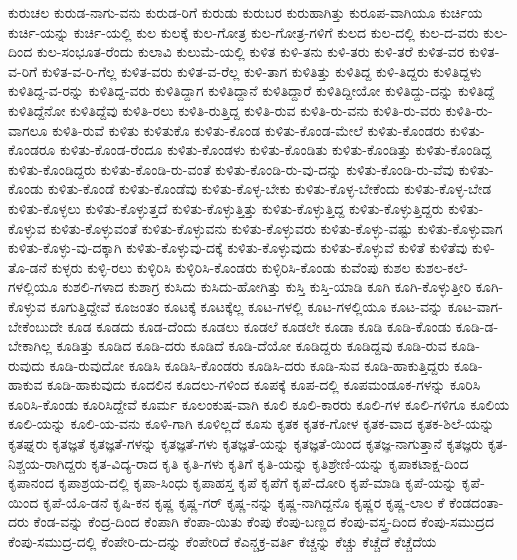 {ಕುರುಚಲ
ಕುರುಡ-ನಾಗು-ವನು
ಕುರುಡ-ರಿಗೆ
ಕುರುಡು
ಕುರುಬರ
ಕುರುಹಾಗಿತ್ತು
ಕುರೂಪ-ವಾಗಿಯೂ
ಕುರ್ಚಿಯ
ಕುರ್ಚಿ-ಯನ್ನು
ಕುರ್ಚಿ-ಯಲ್ಲಿ
ಕುಲ
ಕುಲಕ್ಕೆ
ಕುಲ-ಗೋತ್ರ
ಕುಲ-ಗೋತ್ರ-ಗಳಿಗೆ
ಕುಲದ
ಕುಲ-ದಲ್ಲಿ
ಕುಲ-ದ-ವರು
ಕುಲ-ದಿಂದ
ಕುಲ-ಸಂಭೂತ-ರೆಂದು
ಕುಲಾವಿ
ಕುಲುಮೆ-ಯಲ್ಲಿ
ಕುಳಿತ
ಕುಳಿ-ತನು
ಕುಳಿ-ತರು
ಕುಳಿ-ತರೆ
ಕುಳಿತ-ವರ
ಕುಳಿತ-ವ-ರಿಗೆ
ಕುಳಿತ-ವ-ರಿ-ಗೆಲ್ಲ
ಕುಳಿತ-ವರು
ಕುಳಿತ-ವ-ರೆಲ್ಲ
ಕುಳಿ-ತಾಗ
ಕುಳಿತಿತ್ತು
ಕುಳಿತಿದ್ದ
ಕುಳಿ-ತಿದ್ದರು
ಕುಳಿತಿದ್ದಳು
ಕುಳಿತಿದ್ದ-ವ-ರನ್ನು
ಕುಳಿತಿದ್ದ-ವರು
ಕುಳಿತಿದ್ದಾಗ
ಕುಳಿತಿದ್ದಾನೆ
ಕುಳಿತಿದ್ದಾರೆ
ಕುಳಿತಿದ್ದೀಯೋ
ಕುಳಿತಿದ್ದು-ದನ್ನು
ಕುಳಿತಿದ್ದೆ
ಕುಳಿತಿದ್ದೆನೋ
ಕುಳಿತಿದ್ದೆವು
ಕುಳಿತಿ-ರಲು
ಕುಳಿತಿ-ರುತ್ತಿದ್ದ
ಕುಳಿತಿ-ರುವ
ಕುಳಿತಿ-ರು-ವನು
ಕುಳಿತಿ-ರು-ವರು
ಕುಳಿತಿ-ರು-ವಾಗಲೂ
ಕುಳಿತಿ-ರುವೆ
ಕುಳಿತು
ಕುಳಿತುಕೊ
ಕುಳಿತು-ಕೊಂಡ
ಕುಳಿತು-ಕೊಂಡ-ಮೇಲೆ
ಕುಳಿತು-ಕೊಂಡರು
ಕುಳಿತು-ಕೊಂಡರೂ
ಕುಳಿತು-ಕೊಂಡ-ರೆಂದೂ
ಕುಳಿತು-ಕೊಂಡಳು
ಕುಳಿತು-ಕೊಂಡಿತು
ಕುಳಿತು-ಕೊಂಡಿತ್ತು
ಕುಳಿತು-ಕೊಂಡಿದ್ದ
ಕುಳಿತು-ಕೊಂಡಿದ್ದರು
ಕುಳಿತು-ಕೊಂಡಿ-ರು-ವಂತೆ
ಕುಳಿತು-ಕೊಂಡಿ-ರು-ವು-ದನ್ನು
ಕುಳಿತು-ಕೊಂಡಿ-ರು-ವೆವು
ಕುಳಿತು-ಕೊಂಡು
ಕುಳಿತು-ಕೊಂಡೆ
ಕುಳಿತು-ಕೊಂಡೆವು
ಕುಳಿತು-ಕೊಳ್ಳ-ಬೇಕು
ಕುಳಿತು-ಕೊಳ್ಳ-ಬೇಕೆಂದು
ಕುಳಿತು-ಕೊಳ್ಳ-ಬೇಡ
ಕುಳಿತು-ಕೊಳ್ಳಲು
ಕುಳಿತು-ಕೊಳ್ಳುತ್ತದೆ
ಕುಳಿತು-ಕೊಳ್ಳುತ್ತಿತ್ತು
ಕುಳಿತು-ಕೊಳ್ಳುತ್ತಿದ್ದ
ಕುಳಿತು-ಕೊಳ್ಳುತ್ತಿದ್ದರು
ಕುಳಿತು-ಕೊಳ್ಳುವ
ಕುಳಿತು-ಕೊಳ್ಳುವಂತೆ
ಕುಳಿತು-ಕೊಳ್ಳುವನು
ಕುಳಿತು-ಕೊಳ್ಳುವರು
ಕುಳಿತು-ಕೊಳ್ಳು-ವಷ್ಟು
ಕುಳಿತು-ಕೊಳ್ಳುವಾಗ
ಕುಳಿತು-ಕೊಳ್ಳು-ವು-ದಕ್ಕಾಗಿ
ಕುಳಿತು-ಕೊಳ್ಳುವು-ದಕ್ಕೆ
ಕುಳಿತು-ಕೊಳ್ಳುವುದು
ಕುಳಿತು-ಕೊಳ್ಳುವೆ
ಕುಳಿತೆ
ಕುಳಿತೆವು
ಕುಳಿ-ತೊ-ಡನೆ
ಕುಳ್ಳರು
ಕುಳ್ಳಿ-ರಲು
ಕುಳ್ಳಿರಿಸಿ
ಕುಳ್ಳಿರಿಸಿ-ಕೊಂಡರು
ಕುಳ್ಳಿರಿಸಿ-ಕೊಂಡು
ಕುವೆಂಪು
ಕುಶಲ
ಕುಶಲ-ಕಲೆ-ಗಳಲ್ಲಿಯೂ
ಕುಶಲಿ-ಗಳಾದ
ಕುಶಾಗ್ರ
ಕುಸಿದು
ಕುಸಿದು-ಹೋಗಿತ್ತು
ಕುಸ್ತಿ
ಕುಸ್ತಿ-ಯಾಡಿ
ಕೂಗಿ
ಕೂಗಿ-ಕೊಳ್ಳುತ್ತೀರಿ
ಕೂಗಿ-ಕೊಳ್ಳುವ
ಕೂಗುತ್ತಿದ್ದೇವೆ
ಕೂಜಂತಂ
ಕೂಟಕ್ಕೆ
ಕೂಟಕ್ಕೆಲ್ಲ
ಕೂಟ-ಗಳಲ್ಲಿ
ಕೂಟ-ಗಳಲ್ಲಿಯೂ
ಕೂಟ-ವನ್ನು
ಕೂಟ-ವಾಗ-ಬೇಕೆಂಬುದೇ
ಕೂಡ
ಕೂಡದು
ಕೂಡ-ದೆಂದು
ಕೂಡಲು
ಕೂಡಲೆ
ಕೂಡಲೇ
ಕೂಡಾ
ಕೂಡಿ
ಕೂಡಿ-ಕೊಂಡು
ಕೂಡಿ-ಡ-ಬೇಕಾಗಿಲ್ಲ
ಕೂಡಿತ್ತು
ಕೂಡಿದ
ಕೂಡಿ-ದರು
ಕೂಡಿದೆ
ಕೂಡಿ-ದೆಯೋ
ಕೂಡಿದ್ದರು
ಕೂಡಿದ್ದವು
ಕೂಡಿ-ರುವ
ಕೂಡಿ-ರುವುದು
ಕೂಡಿ-ರುವುದೋ
ಕೂಡಿಸಿ
ಕೂಡಿಸಿ-ಕೊಂಡರು
ಕೂಡಿಸಿ-ದರು
ಕೂಡಿ-ಸುವ
ಕೂಡಿ-ಹಾಕುತ್ತಿದ್ದರು
ಕೂಡಿ-ಹಾಕುವ
ಕೂಡಿ-ಹಾಕುವುದು
ಕೂದಲಿನ
ಕೂದಲು-ಗಳಿಂದ
ಕೂಪಕ್ಕೆ
ಕೂಪ-ದಲ್ಲಿ
ಕೂಪಮಂಡೂಕ-ಗಳನ್ನು
ಕೂರಿಸಿ
ಕೂರಿಸಿ-ಕೊಂಡು
ಕೂರಿಸಿದ್ದೇವೆ
ಕೂರ್ಮ
ಕೂಲಂಕುಷ-ವಾಗಿ
ಕೂಲಿ
ಕೂಲಿ-ಕಾರರು
ಕೂಲಿ-ಗಳ
ಕೂಲಿ-ಗಳಿಗೂ
ಕೂಲಿಯ
ಕೂಲಿ-ಯನ್ನು
ಕೂಲಿ-ಯ-ವನು
ಕೂಳಿ-ಗಾಗಿ
ಕೂಳಿಲ್ಲದೆ
ಕೂಸು
ಕೃತಕ
ಕೃತಕ-ಗೋಳ
ಕೃತಕ-ವಾದ
ಕೃತಕ-ಶಿಲೆ-ಯನ್ನು
ಕೃತಘ್ನರು
ಕೃತಜ್ಞತೆ
ಕೃತಜ್ಞತೆ-ಗಳನ್ನು
ಕೃತಜ್ಞತೆ-ಗಳು
ಕೃತಜ್ಞತೆ-ಯನ್ನು
ಕೃತಜ್ಞತೆ-ಯಿಂದ
ಕೃತಜ್ಞ-ನಾಗುತ್ತಾನೆ
ಕೃತಜ್ಞರು
ಕೃತ-ನಿಶ್ಚಯ-ರಾಗಿದ್ದರು
ಕೃತ-ವಿದ್ಯ-ರಾದ
ಕೃತಿ
ಕೃತಿ-ಗಳು
ಕೃತಿಗೆ
ಕೃತಿ-ಯನ್ನು
ಕೃತಿಶ್ರೇಣಿ-ಯನ್ನು
ಕೃಪಾಕಟಾಕ್ಷ-ದಿಂದ
ಕೃಪಾನಂದ
ಕೃಪಾಶ್ರಯ-ದಲ್ಲಿ
ಕೃಪಾ-ಸಿಂಧು
ಕೃಪಾಹಸ್ತ
ಕೃಪೆ
ಕೃಪೆಗೆ
ಕೃಪೆ-ದೋರಿ
ಕೃಪೆ-ಮಾಡಿ
ಕೃಪೆ-ಯನ್ನು
ಕೃಪೆ-ಯಿಂದ
ಕೃಪೆ-ಯೊ-ಡನೆ
ಕೃಷಿ-ಕನ
ಕೃಷ್ಣ
ಕೃಷ್ಣ-ಗರ್
ಕೃಷ್ಣ-ನನ್ನು
ಕೃಷ್ಣ-ನಾಗಿದ್ದನೊ
ಕೃಷ್ಣರ
ಕೃಷ್ಣ-ಲಾಲ
ಕೆ
ಕೆಂಡದಂತಾ-ದರು
ಕೆಂಡ-ವನ್ನು
ಕೆಂದ್ರ-ದಿಂದ
ಕೆಂಪಾಗಿ
ಕೆಂಪಾ-ಯಿತು
ಕೆಂಪು
ಕೆಂಪು-ಬಣ್ಣದ
ಕೆಂಪು-ವಸ್ತ್ರ-ದಿಂದ
ಕೆಂಪು-ಸಮುದ್ರದ
ಕೆಂಪು-ಸಮುದ್ರ-ದಲ್ಲಿ
ಕೆಂಪೇರಿ-ದು-ದನ್ನು
ಕೆಂಪೇರಿದೆ
ಕೆಎನ್ಚಕ್ರ-ವರ್ತಿ
ಕೆಚ್ಚನ್ನು
ಕೆಚ್ಚು
ಕೆಚ್ಚೆದೆ
ಕೆಚ್ಚೆದೆಯ
}

